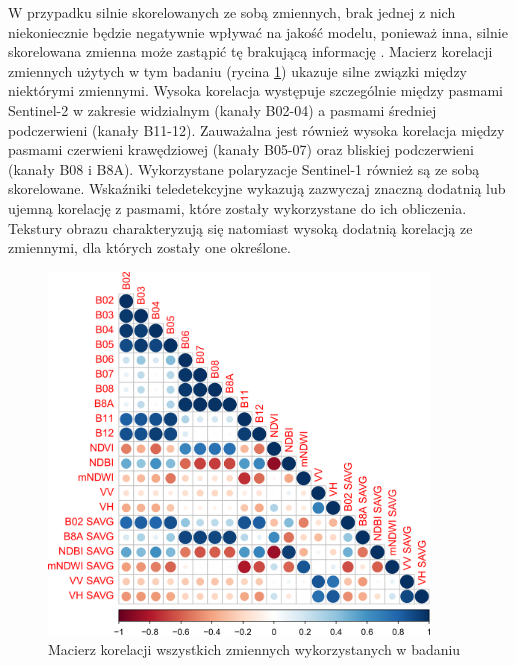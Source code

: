 \documentclass{amuthesis}
\begin{document}
W przypadku silnie skorelowanych ze sobą zmiennych, brak jednej z nich
niekoniecznie będzie negatywnie wpływać na jakość modelu, ponieważ inna,
silnie skorelowana zmienna może zastąpić tę brakującą informację
\autocite{biecek_2021_model_analysis}. Macierz korelacji zmiennych
użytych w tym badaniu (rycina \ref{fig-variables-correlation}) ukazuje
silne związki między niektórymi zmiennymi. Wysoka korelacja występuje
szczególnie między pasmami Sentinel-2 w zakresie widzialnym (kanały
B02-04) a pasmami średniej podczerwieni (kanały B11-12). Zauważalna jest
również wysoka korelacja między pasmami czerwieni krawędziowej (kanały
B05-07) oraz bliskiej podczerwieni (kanały B08 i B8A). Wykorzystane
polaryzacje Sentinel-1 również są ze sobą skorelowane. Wskaźniki
teledetekcyjne wykazują zazwyczaj znaczną dodatnią lub ujemną korelację
z pasmami, które zostały wykorzystane do ich obliczenia. Tekstury obrazu
charakteryzują się natomiast wysoką dodatnią korelacją ze zmiennymi, dla
których zostały one określone.

\begin{figure}[t]

{\centering \includegraphics[width=0.9\textwidth,height=\textheight]{figures/corrplot1.png}

}

\caption{\label{fig-variables-correlation}Macierz korelacji wszystkich
zmiennych wykorzystanych w badaniu}

\end{figure}
\end{document}

